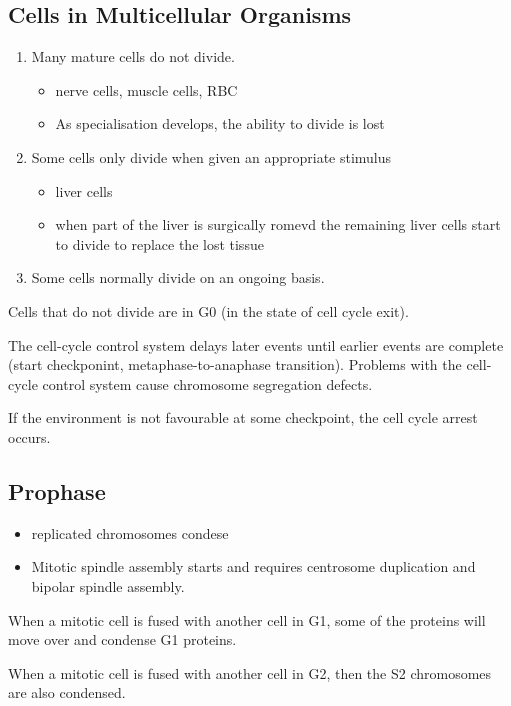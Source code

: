 \documentclass[11pt]{scrartcl}
\begin{document}
\subsection{Cells in Multicellular Organisms}
\begin{enumerate}
\item Many mature cells do not divide.
\begin{itemize}
\item nerve cells, muscle cells, RBC
\item As specialisation develops, the ability to divide is lost
\end{itemize}
\item Some cells only divide when given an appropriate stimulus
\begin{itemize}
\item liver cells
\item when part of the liver is surgically romevd the remaining liver
  cells start to divide to replace the lost tissue
\end{itemize}
\item Some cells normally divide on an ongoing basis.
\end{enumerate}

Cells that do not divide are in G0 (in the state of cell cycle exit).

The cell-cycle control system delays later events until earlier events
are complete (start checkponint, metaphase-to-anaphase
transition). Problems with the cell-cycle control system cause
chromosome segregation defects.

If the environment is not favourable at some checkpoint, the cell
cycle arrest occurs.

\subsection{Prophase}

\begin{itemize}
\item replicated chromosomes condese
\item Mitotic spindle assembly starts and requires centrosome
  duplication and bipolar spindle assembly.
\end{itemize}
When a mitotic cell is fused with another cell in G1, some of the
proteins will move over and condense G1 proteins.

When a mitotic cell is fused with another cell in G2, then the S2
chromosomes are also condensed.
\end{document}
